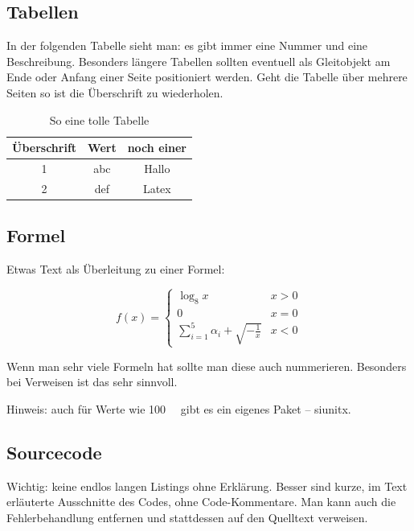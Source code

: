 \subsection{Tabellen}

In der folgenden Tabelle sieht man: es gibt immer eine Nummer und
eine Beschreibung. Besonders längere Tabellen sollten eventuell als
Gleitobjekt am Ende oder Anfang einer Seite positioniert werden. Geht
die Tabelle über mehrere Seiten so ist die Überschrift zu wiederholen.

\begin{table}[h]
\begin{centering}
\begin{tabular}{|c|c|c|}
\hline
Überschrift & Wert & noch einer\tabularnewline
\hline
\hline
1 & abc & Hallo\tabularnewline
\hline
2 & def & Latex\tabularnewline
\hline
\end{tabular}
\par\end{centering}

\caption{So eine tolle Tabelle}
\end{table}



\subsection{Formel}

Etwas Text als Überleitung zu einer Formel:

\[
f(x)=\left\{ \begin{array}{cc}
\log_{8}x & x>0\\
0 & x=0\\
\sum_{i=1}^{5}\alpha_{i}+\sqrt{-\frac{1}{x}} & x<0
\end{array}\right.
\]


Wenn man sehr viele Formeln hat sollte man diese auch nummerieren.
Besonders bei Verweisen ist das sehr sinnvoll.

Hinweis: auch für Werte wie \SI{100}{\mebi\byte} gibt es ein eigenes Paket -- siunitx.


\subsection{Sourcecode}


Wichtig: keine endlos langen Listings ohne Erklärung. Besser sind kurze, im Text erläuterte Ausschnitte
des Codes, ohne Code-Kommentare. Man kann \zB auch die Fehlerbehandlung entfernen und stattdessen auf
den Quelltext verweisen.

